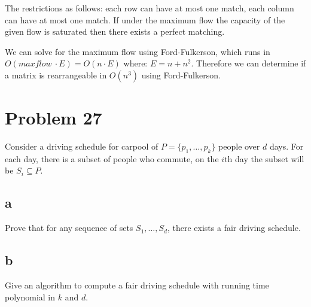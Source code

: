 \documentclass{amsart}
\theoremstyle{definition}
\theoremstyle{remark}
\numberwithin{equation}{section}
\begin{document}
The restrictions as follows: each row can have at most one match, each column can have at most one match. If under the maximum flow the capacity of the given flow is saturated then there exists a perfect matching.

\rmkstar We can solve for the maximum flow using Ford-Fulkerson, which runs in $O(maxflow\ \cdot E) = O(n \cdot E)$ where: $ E = n + n^2 $. Therefore we can determine if a matrix is rearrangeable in $O(n^3)$ using Ford-Fulkerson.

\section{Problem 27}
Consider a driving schedule for carpool of $P = \{ p_1, \ldots, p_k \}$ people over $d$ days. For each day, there is a subset of people who commute, on the $i$th day the subset will be $S_i \subseteq P$.

\subsection*{a}
Prove that for any sequence of sets $S_1, \ldots , S_d$, there exists a fair driving schedule.




\subsection*{b}
Give an algorithm to compute a fair driving schedule with running time polynomial in $k$ and $d$.

\end{document}
